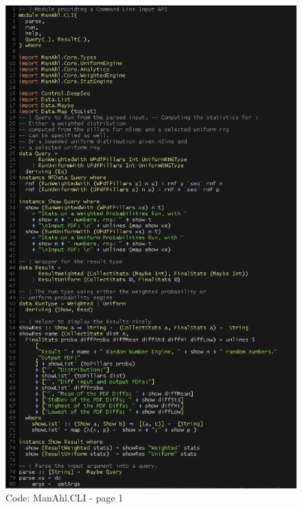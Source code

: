 \documentclass[12pt,a4paper,article]{memoir} %
\begin{document}
\begin{figure}[h!]
\centering
\includegraphics[width=1\textwidth]{img/code-cli-1.png}
\caption{Code: ManAhl.CLI - page 1}
\label{fig:core.cli1}
\end{figure}
\end{document}
